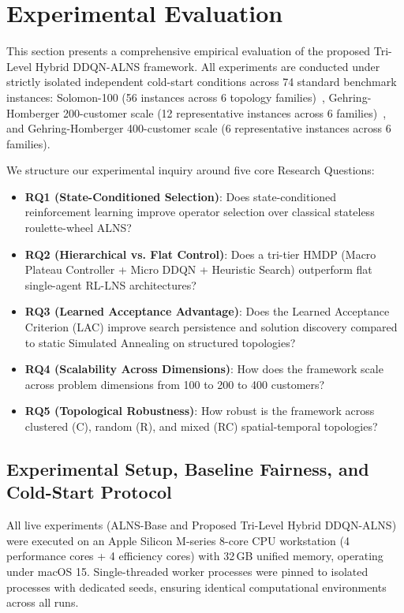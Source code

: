 \documentclass{ieeeaccess}
\begin{document}
\section{Experimental Evaluation}
\label{sec:experiments}

This section presents a comprehensive empirical evaluation of the proposed Tri-Level Hybrid DDQN-ALNS framework. All experiments are conducted under strictly isolated independent cold-start conditions across 74 standard benchmark instances: Solomon-100 (56 instances across 6 topology families)~\cite{Solomon1987}, Gehring-Homberger 200-customer scale (12 representative instances across 6 families)~\cite{gehring1999parallel}, and Gehring-Homberger 400-customer scale (6 representative instances across 6 families).

We structure our experimental inquiry around five core Research Questions:
\begin{itemize}
    \item \textbf{RQ1 (State-Conditioned Selection)}: Does state-conditioned reinforcement learning improve operator selection over classical stateless roulette-wheel ALNS?
    \item \textbf{RQ2 (Hierarchical vs. Flat Control)}: Does a tri-tier HMDP (Macro Plateau Controller + Micro DDQN + Heuristic Search) outperform flat single-agent RL-LNS architectures?
    \item \textbf{RQ3 (Learned Acceptance Advantage)}: Does the Learned Acceptance Criterion (LAC) improve search persistence and solution discovery compared to static Simulated Annealing on structured topologies?
    \item \textbf{RQ4 (Scalability Across Dimensions)}: How does the framework scale across problem dimensions from 100 to 200 to 400 customers?
    \item \textbf{RQ5 (Topological Robustness)}: How robust is the framework across clustered (C), random (R), and mixed (RC) spatial-temporal topologies?
\end{itemize}

\subsection{Experimental Setup, Baseline Fairness, and Cold-Start Protocol}
\label{sec:exp_setup}

All live experiments (ALNS-Base and Proposed Tri-Level Hybrid DDQN-ALNS) were executed on an Apple Silicon M-series 8-core CPU workstation (4 performance cores + 4 efficiency cores) with 32\,GB unified memory, operating under macOS 15. Single-threaded worker processes were pinned to isolated processes with dedicated seeds, ensuring identical computational environments across all runs.
\end{document}
